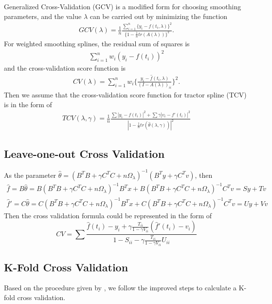 Generalized Cross-Validation (GCV) is a modified form for choosing smoothing parameters, and the value $\lambda$ can be carried out by minimizing the function 
\begin{align*}
GCV(\lambda)=\frac{1}{n}\frac{\sum_{i=1}^{n}\{y_i-\hat{f}(t_i,\lambda)\}^2}{\{1-\frac{1}{n}tr(A(\lambda))\}^2}.
\end{align*}
For weighted smoothing splines, the residual sum of squares is 
\begin{align*}
\sum_{i=1}^{n}w_i (y_i-f(t_i))^2
\end{align*}
and the cross-validation score function is 
\begin{align*}
CV(\lambda)=\sum_{i=1}^n w_i\{\frac{y_i-\hat{f}(t_i,\lambda)}{(I-A(\lambda))_{ii}}\}^2.
\end{align*}
Then we assume that the cross-validation score function for tractor spline (TCV) is in the form of
\begin{align*}
TCV(\lambda, \gamma)=\frac{1}{n}\frac{\sum |y_i-f(t_i)|^2+\sum \gamma |v_i-f'(t_i)|^2}{|1-\frac{1}{n}tr(\hat{\theta}(\lambda,\gamma))|^2}
\end{align*}

\subsection{Leave-one-out Cross Validation}
As the parameter $\hat{\theta}=(B^TB+\gamma C^TC+n\Omega_\lambda)^{-1}(B^Ty+\gamma C^Tv)$, then
\begin{align*}
 \hat{f}=B\hat{\theta}=B(B^TB+\gamma C^TC+n\Omega_\lambda)^{-1}B^Tx+B(B^TB+\gamma C^TC+n\Omega_\lambda)^{-1}C^Tv=Sy+Tv\\
\hat{f}'=C\hat{\theta}=C(B^TB+\gamma C^TC+n\Omega_\lambda)^{-1}B^Tx+C(B^TB+\gamma C^TC+n\Omega_\lambda)^{-1}C^Tv=Uy+Vv
\end{align*}
Then the cross validation formula could be represented in the form of 
\begin{equation}
CV=\sum \frac{\hat{f}(t_i)-y_i+\gamma \frac{T_{ii}}{1-\gamma V_{ii}}(\hat{f}'(t_i)-v_i)}{1-S_{ii}-\gamma\frac{T_{ii}}{1-\gamma V_{ii}}U_{ii}}
\end{equation}

\subsection{K-Fold Cross Validation}

Based on the procedure given by \cite{wahba1975completely}, we  follow the improved steps to calculate a K-fold cross validation. 


